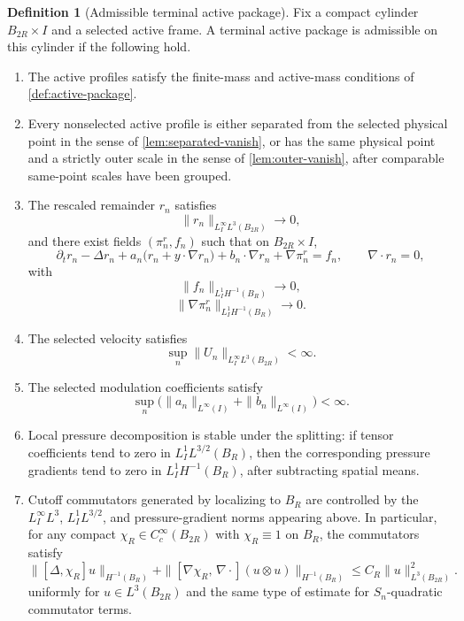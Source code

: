 \documentclass[11pt]{amsart}
\theoremstyle{plain}
\theoremstyle{definition}
\newtheorem{definition}[theorem]{Definition}
\theoremstyle{remark}
\begin{document}
\begin{definition}[Admissible terminal active package]\label{def:admissible-terminal}
Fix a compact cylinder \(B_{2R}\times I\) and a selected active frame.  A
terminal active package is admissible on this cylinder if the following hold.
\begin{enumerate}[label=\textup{(\roman*)}]
\item The active profiles satisfy the finite-mass and active-mass conditions of
\cref{def:active-package}.
\item Every nonselected active profile is either separated from the selected
physical point in the sense of \cref{lem:separated-vanish}, or has the same
physical point and a strictly outer scale in the sense of
\cref{lem:outer-vanish}, after comparable same-point scales have been grouped.
\item The rescaled remainder \(r_n\) satisfies
\[
  \|r_n\|_{L^\infty_I L^3(B_{2R})}\to0,
\]
and there exist fields \((\pi_n^r,f_n)\) such that on \(B_{2R}\times I\),
\[
  \partial_t r_n-\Delta r_n+a_n\bigl(r_n+y\cdot\nabla r_n\bigr)+b_n\cdot\nabla r_n
  +\nabla\pi_n^r=f_n,\qquad
  \nabla\cdot r_n=0,
\]
with
\[
  \|f_n\|_{L^1_IH^{-1}(B_R)}\to0,
\]
\[
  \|\nabla\pi_n^r\|_{L^1_IH^{-1}(B_R)}\to0.
\]
\item The selected velocity satisfies
\[
  \sup_n\|U_n\|_{L^\infty_I L^3(B_{2R})}<\infty .
\]
\item The selected modulation coefficients satisfy
\[
  \sup_n\bigl(\|a_n\|_{L^\infty(I)}+\|b_n\|_{L^\infty(I)}\bigr)<\infty .
\]
\item Local pressure decomposition is stable under the splitting: if tensor
coefficients tend to zero in \(L^1_IL^{3/2}(B_R)\), then the corresponding
pressure gradients tend to zero in \(L^1_IH^{-1}(B_R)\), after subtracting
spatial means.
\item Cutoff commutators generated by localizing to \(B_R\) are controlled by
the \(L^\infty_I L^3\), \(L^1_I L^{3/2}\), and pressure-gradient norms appearing
above.  In particular, for any compact \(\chi_R\in C_c^\infty(B_{2R})\) with
\(\chi_R\equiv1\) on \(B_R\), the commutators satisfy
\[
  \|[\Delta,\chi_R]u\|_{H^{-1}(B_R)}
  +\|[\nabla\chi_R,\,\nabla\cdot](u\otimes u)\|_{H^{-1}(B_R)}
  \le C_R\|u\|_{L^3(B_{2R})}^2.
\]
uniformly for \(u\in L^3(B_{2R})\) and the same type of estimate for
\(S_n\)-quadratic commutator terms.
\end{enumerate}
\end{definition}
\end{document}
